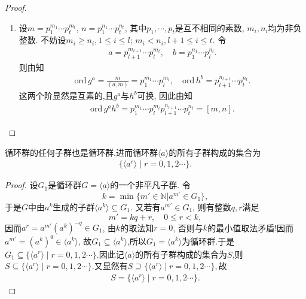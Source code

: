 \documentclass[../../main.tex]{subfiles}%
\begin{document}
\begin{proof}
\begin{enumerate}[(1)]
\item 设$m=p_1^{m_1}\cdots p_t^{m_t}$, $n=p_1^{n_1}\cdots p_t^{n_t}$, 其中$p_1,\cdots,p_t$是互不相同的素数, $m_i, n_i$均为非负整数. 不妨设$m_i \geqslant n_i, 1 \leqslant i \leqslant l$; $m_i < n_i, l+1 \leqslant i \leqslant t$. 令
\begin{align*}
a=p_{l+1}^{m_{l+1}}\cdots p_{t}^{m_t},\quad b=p_{1}^{n_1}\cdots p_{l}^{n_l}.
\end{align*}
则由知
\begin{align*}
\mathrm{ord}\,g^a=\frac{m}{\left( a,m \right)}=p_{1}^{m_1}\cdots p_{l}^{m_l},\quad \mathrm{ord}\,h^b=p_{l+1}^{n_{l+1}}\cdots p_{t}^{n_t}.
\end{align*}
这两个阶显然是互素的,且$g^a$与$h^b$可换, 因此由知
\begin{align*}
\mathrm{ord}\,g^ah^b=p_{1}^{m_1}\cdots p_{l}^{m_l}p_{l+1}^{n_{l+1}}\cdots p_{t}^{n_t}=[m,n].
\end{align*}
\end{enumerate}

\end{proof}

\begin{theorem}[循环群的任何子群也是循环群]\label{theorem:循环群的任何子群也是循环群}
循环群的任何子群也是循环群.进而循环群$\langle a \rangle$的所有子群构成的集合为
\begin{align*}
\{\langle a^r \rangle\mid r=0,1,2\cdots\}.
\end{align*}
\end{theorem}
\begin{proof}

设$G_1$是循环群$G=\langle a\rangle$的一个非平凡子群. 令
\[
k=\min\{m'\in\mathbb{N}|a^{m'}\in G_1\},
\]
于是$G$中由$a^k$生成的子群$\langle a^k\rangle\subseteq G_1$. 又若有$a^{m'}\in G_1$, 则有整数$q,r$满足
\[
m'=kq+r,\quad 0\leqslant r<k,
\]
因而$a^r=a^{m'}(a^k)^{-q}\in G_1$, 由$k$的取法知$r=0$, 否则与$k$的最小值取法矛盾!因而$a^{m'}=(a^k)^q\in\langle a^k\rangle$, 故$G_1\subseteq \langle a^k \rangle$,所以$G_1=\langle a^k\rangle$为循环群.于是$G_1\subseteq \{\langle a^r \rangle\mid r=0,1,2\cdots\}.$因此记$\langle a\rangle$的所有子群构成的集合为$S$,则$S\subseteq \{\langle a^r \rangle\mid r=0,1,2\cdots\}.$又显然有$S\supseteq \{\langle a^r \rangle\mid r=0,1,2\cdots\},$故
\begin{align*}
S= \{\langle a^r \rangle\mid r=0,1,2\cdots\}.
\end{align*}

\end{proof}
\end{document}
